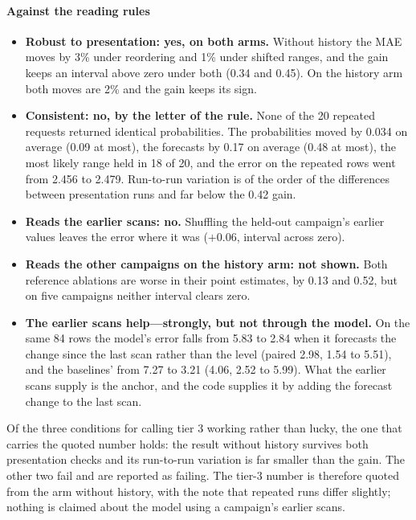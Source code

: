 \paragraph{Against the reading rules}
\begin{itemize}
  \item \textbf{Robust to presentation: yes, on both arms.} Without history the MAE moves by 3\% under reordering and
        1\% under shifted ranges, and the gain keeps an interval above zero under both (0.34 and 0.45\pp). On the
        history arm both moves are 2\% and the gain keeps its sign.
  \item \textbf{Consistent: no, by the letter of the rule.} None of the 20 repeated requests returned identical
        probabilities. The probabilities moved by 0.034 on average (0.09 at most), the forecasts by 0.17\pp{} on
        average (0.48 at most), the most likely range held in 18 of 20, and the error on the repeated rows went from
        2.456 to 2.479\pp. Run-to-run variation is of the order of the differences between presentation runs and far
        below the 0.42\pp{} gain.
  \item \textbf{Reads the earlier scans: no.} Shuffling the held-out campaign's earlier values leaves the error where
        it was ($+0.06$\pp, interval across zero).
  \item \textbf{Reads the other campaigns on the history arm: not shown.} Both reference ablations are worse in their
        point estimates, by 0.13 and 0.52\pp, but on five campaigns neither interval clears zero.
  \item \textbf{The earlier scans help---strongly, but not through the model.} On the same 84 rows the model's error
        falls from 5.83 to 2.84\pp{} when it forecasts the change since the last scan rather than the level (paired
        2.98\pp, 1.54 to 5.51), and the baselines' from 7.27 to 3.21\pp{} (4.06\pp, 2.52 to 5.99). What the earlier
        scans supply is the anchor, and the code supplies it by adding the forecast change to the last scan.
\end{itemize}
Of the three conditions for calling tier 3 working rather than lucky, the one that carries the quoted number holds:
the result without history survives both presentation checks and its run-to-run variation is far smaller than the
gain. The other two fail and are reported as failing. The tier-3 number is therefore quoted from the arm without
history, with the note that repeated runs differ slightly; nothing is claimed about the model using a campaign's
earlier scans.

